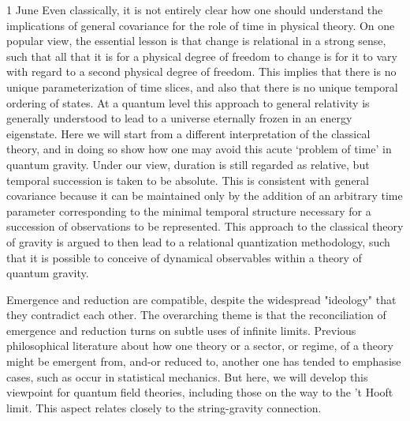 \documentclass{conference}
\begin{document}
\begin{Day}{1 June}
  {Even classically, it is not entirely clear how one should understand the implications of general covariance for the role of time in physical theory. On one popular view, the essential lesson is that change is relational in a strong sense, such that all that it is for a physical degree of freedom to change is for it to vary with regard to a second physical degree of freedom. This implies that there is no unique parameterization of time slices, and also that there is no unique temporal ordering of states.  At a quantum level this approach to general relativity is generally understood to lead to a universe eternally frozen in an energy eigenstate. Here we will start from a different interpretation of the classical theory, and in doing so show how one may avoid this acute `problem of time' in quantum gravity. Under our view, duration is still regarded as relative, but temporal succession is taken to be absolute. This is consistent with general covariance because it can be maintained only by the addition of an arbitrary time parameter corresponding to the minimal temporal structure necessary for a succession of observations to be represented. This approach to the classical theory of gravity is argued to then lead to a relational quantization methodology, such that it is possible to conceive of dynamical observables within a theory of quantum gravity.}


  {Emergence and reduction are compatible, despite the widespread "ideology" that they contradict each other. The overarching theme is that the reconciliation of emergence and reduction turns on subtle uses of infinite limits. Previous philosophical literature about how one theory or a sector, or regime, of a theory might be emergent from, and-or reduced to, another one has tended to emphasise cases, such as occur in statistical mechanics. But here, we will develop this viewpoint for quantum field theories, including those on the way to the 't Hooft limit. This aspect relates closely to the string-gravity connection.}



\end{Day}
\end{document}
